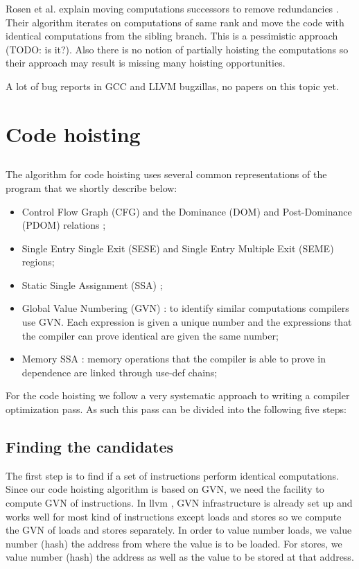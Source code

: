 \documentclass{sig-alternate}
\begin{document}
Rosen et al. explain moving computations successors to remove redundancies
\cite{rosen1988global}. Their algorithm iterates on computations of same rank
and move the code with identical computations from the sibling branch. This is a
pessimistic approach (TODO: is it?). Also there is no notion of partially
hoisting the computations so their approach may result is missing many hoisting
opportunities.

A lot of bug reports in GCC and LLVM bugzillas, no papers on this topic yet.


\newpage

\section{Code hoisting}

\subsection{}
The algorithm for code hoisting uses several common representations of the
program that we shortly describe below:
\begin{itemize}
\item Control Flow Graph (CFG) and the Dominance (DOM) and Post-Dominance (PDOM)
  relations \cite{dragonbook};
\item Single Entry Single Exit (SESE) \cite{sese} and Single Entry Multiple Exit
  (SEME) regions;
\item Static Single Assignment (SSA) \cite{cytron};
\item Global Value Numbering (GVN) \cite{rosen1988global,click1995global}: to
  identify similar computations compilers use GVN.  Each expression is given a
  unique number and the expressions that the compiler can prove identical are
  given the same number;
\item Memory SSA \cite{novillo2007memory}: memory operations that the compiler
  is able to prove in dependence are linked through use-def chains;
\end{itemize}


For the code hoisting we follow a very systematic approach to writing a compiler
optimization pass. As such this pass can be divided into the following five
steps:

\subsection{Finding the candidates}
The first step is to find if a set of instructions perform identical
computations. Since our code hoisting algorithm is based on GVN, we need the
facility to compute GVN of instructions.  In llvm \cite{llvm}, GVN
infrastructure is already set up and works well for most kind of instructions
except loads and stores so we compute the GVN of loads and stores separately. In
order to value number loads, we value number (hash) the address from where the
value is to be loaded. For stores, we value number (hash) the address as well as
the value to be stored at that address.
\end{document}
